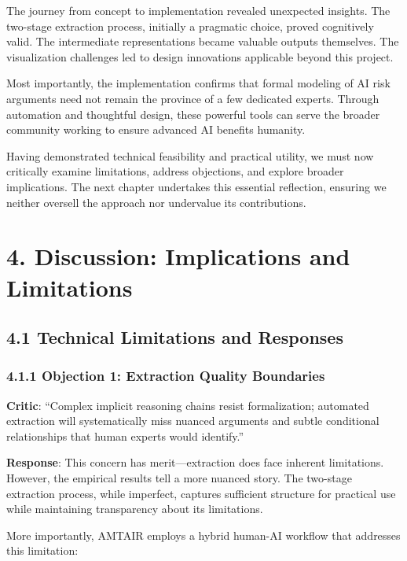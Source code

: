 \documentclass[
  11pt,
  letterpaper,
]{book}
\begin{document}
The journey from concept to implementation revealed unexpected insights.
The two-stage extraction process, initially a pragmatic choice, proved
cognitively valid. The intermediate representations became valuable
outputs themselves. The visualization challenges led to design
innovations applicable beyond this project.

Most importantly, the implementation confirms that formal modeling of AI
risk arguments need not remain the province of a few dedicated experts.
Through automation and thoughtful design, these powerful tools can serve
the broader community working to ensure advanced AI benefits humanity.

Having demonstrated technical feasibility and practical utility, we must
now critically examine limitations, address objections, and explore
broader implications. The next chapter undertakes this essential
reflection, ensuring we neither oversell the approach nor undervalue its
contributions.


\chapter{4. Discussion: Implications and
Limitations}\label{sec-discussion}

\section{4.1 Technical Limitations and
Responses}\label{sec-technical-limitations}

\subsection{4.1.1 Objection 1: Extraction Quality
Boundaries}\label{sec-extraction-boundaries}

\textbf{Critic}: ``Complex implicit reasoning chains resist
formalization; automated extraction will systematically miss nuanced
arguments and subtle conditional relationships that human experts would
identify.''

\textbf{Response}: This concern has merit---extraction does face
inherent limitations. However, the empirical results tell a more nuanced
story. The two-stage extraction process, while imperfect, captures
sufficient structure for practical use while maintaining transparency
about its limitations.

More importantly, AMTAIR employs a hybrid human-AI workflow that
addresses this limitation:
\end{document}
